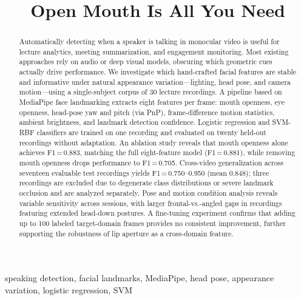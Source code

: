 \documentclass[conference]{IEEEtran}
\begin{document}
\title{Open Mouth Is All You Need}

\author{
}

\maketitle

\begin{abstract}
Automatically detecting when a speaker is talking in monocular video is useful
for lecture analytics, meeting summarization, and engagement monitoring.
Most existing approaches rely on audio or deep visual models, obscuring
which geometric cues actually drive performance.
We investigate which hand-crafted facial features are stable and informative
under natural appearance variation—lighting, head pose, and camera motion—using
a single-subject corpus of 30 lecture recordings.
A pipeline based on MediaPipe face landmarking extracts eight features per frame:
mouth openness, eye openness, head-pose yaw and pitch (via PnP), frame-difference
motion statistics, ambient brightness, and landmark detection confidence.
Logistic regression and SVM-RBF classifiers are trained on one recording and
evaluated on twenty held-out recordings without adaptation.
An ablation study reveals that mouth openness alone achieves F1\,=\,0.883,
matching the full eight-feature model (F1\,=\,0.881), while removing mouth
openness drops performance to F1\,=\,0.705.
Cross-video generalization across seventeen evaluable test recordings yields
F1\,=\,0.750--0.950 (mean 0.848); three recordings are excluded due to degenerate
class distributions or severe landmark occlusion and are analyzed separately.
Pose and motion condition analysis reveals variable sensitivity across sessions,
with larger frontal-vs.-angled gaps in recordings featuring extended head-down postures.
A fine-tuning experiment confirms that adding up to 100 labeled target-domain frames
provides no consistent improvement, further supporting the robustness of lip aperture
as a cross-domain feature.
\end{abstract}

\begin{IEEEkeywords}
speaking detection, facial landmarks, MediaPipe, head pose, appearance variation,
logistic regression, SVM
\end{IEEEkeywords}
\end{document}
